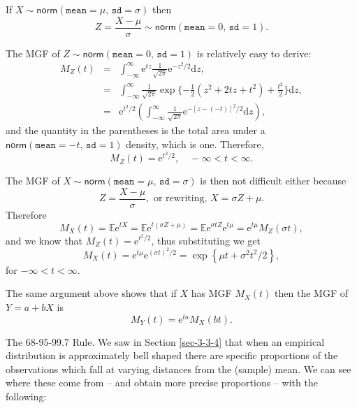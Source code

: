 \begin{prop}
If \(X\sim\mathsf{norm}(\mathtt{mean}=\mu,\,\mathtt{sd}=\sigma)\) then
\begin{equation}
Z=\frac{X-\mu}{\sigma}\sim\mathsf{norm}(\mathtt{mean}=0,\,\mathtt{sd}=1).
\end{equation}
\end{prop}

The MGF of \(Z\sim\mathsf{norm}(\mathtt{mean}=0,\,\mathtt{sd}=1)\) is
relatively easy to derive:
\begin{eqnarray*}
M_{Z}(t) & = & \int_{-\infty}^{\infty}\mathrm{e}^{tz}\frac{1}{\sqrt{2\pi}}\mathrm{e}^{-z^{2}/2}\mathrm{d} z,\\
 & = & \int_{-\infty}^{\infty}\frac{1}{\sqrt{2\pi}}\exp \{ -\frac{1}{2}\left(z^{2}+2tz+t^{2}\right)+\frac{t^{2}}{2} \} \mathrm{d} z,\\
 & = & \mathrm{e}^{t^{2}/2}\left(\int_{-\infty}^{\infty}\frac{1}{\sqrt{2\pi}}\mathrm{e}^{-[z-(-t)]^{2}/2}\mathrm{d} z\right),
\end{eqnarray*}
and the quantity in the parentheses is the total area under a \(\mathsf{norm}(\mathtt{mean}=-t,\,\mathtt{sd}=1)\) density, which is one. Therefore,
\begin{equation}
M_{Z}(t)=\mathrm{e}^{t^{2}/2},\quad -\infty < t < \infty.
\end{equation}


The MGF of
\(X\sim\mathsf{norm}(\mathtt{mean}=\mu,\,\mathtt{sd}=\sigma)\) is then
not difficult either because \[ Z=\frac{X-\mu}{\sigma},\mbox{ or
rewriting, }X=\sigma Z+\mu.  \] Therefore \[
M_{X}(t)=\mathbb{E}\mathrm{e}^{tX}=\mathbb{E}\mathrm{e}^{t(\sigma
Z+\mu)}=\mathbb{E}\mathrm{e}^{\sigma
tZ}\mathrm{e}^{t\mu}=\mathrm{e}^{t\mu}M_{Z}(\sigma t), \] and we know
that \(M_{Z}(t)=\mathrm{e}^{t^{2}/2}\), thus substituting we get \[
M_{X}(t)=\mathrm{e}^{t\mu}\mathrm{e}^{(\sigma t)^{2}/2}=\exp\left\{
\mu t+\sigma^{2}t^{2}/2\right\} , \] for \(-\infty<t<\infty\).


\begin{fact}
The same argument above shows that if \(X\) has MGF \(M_{X}(t)\) then
the MGF of \(Y=a+bX\) is
\begin{equation}
M_{Y}(t)=\mathrm{e}^{ta}M_{X}(bt).
\end{equation}
\end{fact}


The 68-95-99.7 Rule. We saw in Section \ref{sec-3-3-4} that when an
empirical distribution is approximately bell shaped there are specific
proportions of the observations which fall at varying distances from
the (sample) mean. We can see where these come from -- and obtain more
precise proportions -- with the following:


